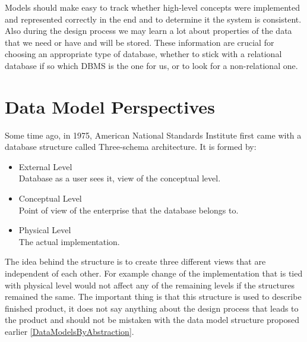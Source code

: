 Models should make easy to track whether high-level concepts were implemented and represented correctly in the end and to determine it the system is consistent. \\

Also during the design process we may learn a lot about properties of the data that we need or have and will be stored. These information are crucial for choosing an appropriate type of database, whether to stick with a relational database if so which DBMS is the one for us, or to look for a non-relational one. \\


\section{Data Model Perspectives}

Some time ago, in 1975, American National Standards Institute \cite{ANSIArchitecture75} first came with a database structure called Three-schema architecture. It is formed by:
\begin{itemize}
	\item External Level \\ Database as a user sees it, view of the conceptual level. 
	\item Conceptual Level \\ Point of view of the enterprise that the database belongs to.
	\item Physical Level \\ The actual implementation.
\end{itemize}

The idea behind the structure is to create three different views that are independent of each other. For example change of the implementation that is tied with physical level would not affect any of the remaining levels if the structures remained the same. The important thing is that this structure is used to describe finished product, it does not say anything about the design process that leads to the product and should not be mistaken with the data model structure proposed earlier \ref{DataModelsByAbstraction}.\\

